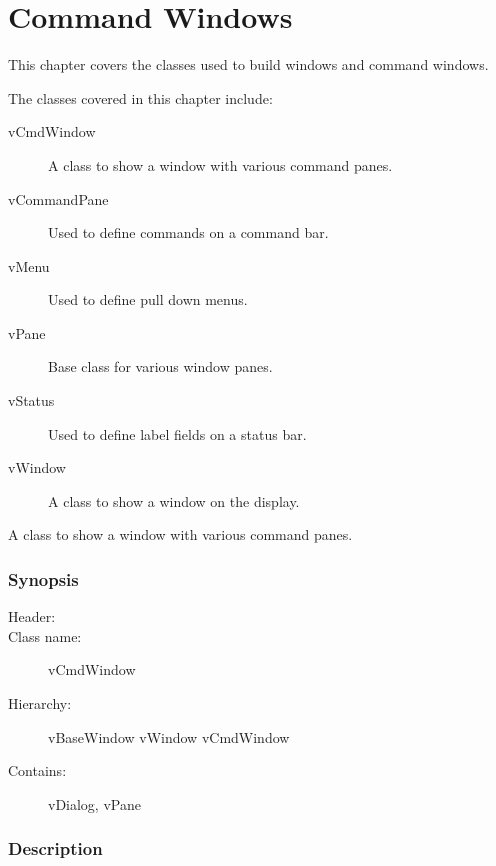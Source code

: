 
\chapter {Command Windows}

This chapter covers the classes used to build windows and command
windows.

The classes covered in this chapter include:

\begin{description}
	\item[vCmdWindow] A class to show a window with various command panes.
	\item[vCommandPane] Used to define commands on a command bar.
	\item[vMenu] Used to define pull down menus.
	\item[vPane] Base class for various window panes.
	\item[vStatus] Used to define label fields on a status bar.
	\item[vWindow] A class to show a window on the display.
\end{description}



A class to show a window with various command panes.

\subsection* {Synopsis}

\begin{description}
	\item [Header:] 
	\item [Class name:] vCmdWindow
 	\item [Hierarchy:] vBaseWindow \rta vWindow \rta vCmdWindow
	\item [Contains:] vDialog, vPane
\end{description}

\subsection* {Description}

